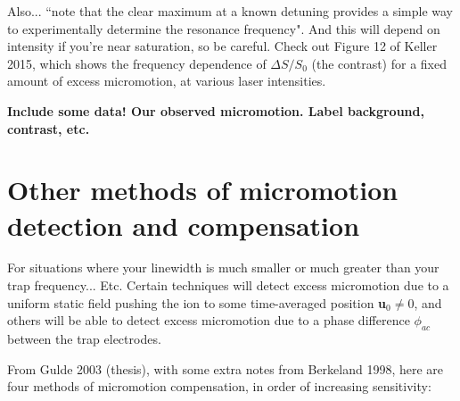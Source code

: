 \documentclass{article}
\begin{document}
Also... ``note that the clear maximum at a known detuning provides a simple way to experimentally determine the resonance frequency". And this will depend on intensity if you're near saturation, so be careful. Check out Figure 12 of Keller 2015, which shows the frequency dependence of $\Delta S / S_0$ (the contrast) for a fixed amount of excess micromotion, at various laser intensities.

\textbf{Include some data! Our observed micromotion. Label background, contrast, etc.}


\section{Other methods of micromotion detection and compensation}

For situations where your linewidth is much smaller or much greater than your trap frequency... Etc. Certain techniques will detect excess micromotion due to a uniform static field pushing the ion to some time-averaged position \textbf{u}$_0 \neq 0$, and others will be able to detect excess micromotion due to a phase difference $\phi_{ac}$ between the trap electrodes. 

From Gulde 2003 (thesis), with some extra notes from Berkeland 1998, here are four methods of micromotion compensation, in order of increasing sensitivity:
\end{document}
